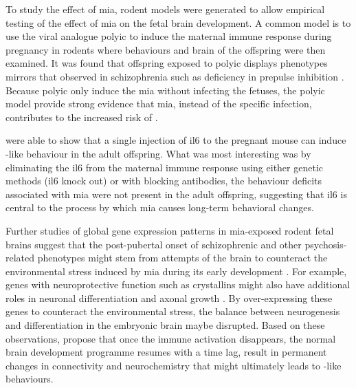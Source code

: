 	To study the effect of \gls{mia}, rodent models were generated to allow empirical testing of the effect of \gls{mia} on the fetal brain development. 
	A common model is to use the viral analogue \gls{polyic} to induce the maternal immune response during pregnancy in rodents where behaviours and brain of the offspring were then examined.
	It was found that offspring exposed to \gls{polyic} displays phenotypes mirrors that observed in schizophrenia \citep{Li2009c,Meyer2009b,Li2010a} such as deficiency in prepulse inhibition \citep{Cadenhead2000}.
	Because \gls{polyic} only induce the \gls{mia} without infecting the fetuses, the \gls{polyic} model provide strong evidence that \gls{mia}, instead of the specific infection, contributes to the increased risk of .
	
	\citet{Smith2007} were able to show that a single injection of \gls{il6} to the pregnant mouse can induce -like behaviour in the adult offspring. 
	What was most interesting was by eliminating the \gls{il6} from the maternal immune response using either genetic methods (\gls{il6} knock out) or with blocking antibodies, the behaviour deficits associated with \gls{mia} were not present in the adult offspring, suggesting that \gls{il6} is central to the process by which \gls{mia} causes long-term behavioral changes.
	
	Further studies of global gene expression patterns in \gls{mia}-exposed rodent fetal brains \citep{Oskvig2012,Garbett2012a} suggest that the post-pubertal onset of schizophrenic and other psychosis-related phenotypes might stem from attempts of the brain to counteract the environmental stress induced by \gls{mia} during its early development \citep{Garbett2012a}.
	For example, genes with neuroprotective function such as crystallins might also have additional roles in neuronal differentiation and axonal growth \citep{Garbett2012a}. 
	By over-expressing these genes to counteract the environmental stress, the balance between neurogenesis and differentiation in the embryonic brain maybe disrupted. 
	Based on these observations, \citet{Garbett2012a} propose that once the immune activation disappears, the normal brain development programme resumes with a time lag, result in permanent changes in connectivity and neurochemistry that might ultimately leads to -like behaviours.
	
